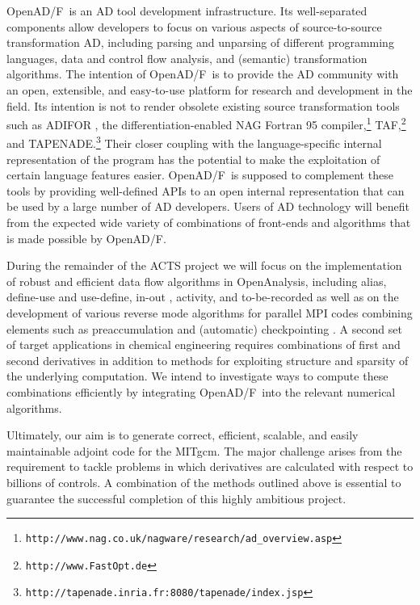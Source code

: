 \documentclass[11pt]{article}
\newcommand{\OpenADF}{OpenAD/F}
\newcommand{\OpenAnalysis}{OpenAnalysis}
\newcommand{\code}[1]{{\small\tt{#1}}}
\begin{document}
\OpenADF\ is an AD tool development infrastructure. Its well-separated components
allow developers to focus on various aspects of source-to-source 
transformation AD, including parsing and unparsing of different programming
languages, data and control flow analysis, and (semantic) transformation 
algorithms. The intention of \OpenADF\ is to provide the AD community with 
an open, extensible, and easy-to-use platform for research and development
in the field. Its intention is not to render obsolete existing source transformation
tools such as ADIFOR \cite{adiforWeb}, 
the differentiation-enabled NAG Fortran 95 
compiler,\footnote{\code{http://www.nag.co.uk/nagware/research/ad\_overview.asp}} TAF,\footnote{\code{http://www.FastOpt.de}} and TAPENADE.\footnote{\code{http://tapenade.inria.fr:8080/tapenade/index.jsp}} 
Their closer coupling with the language-specific internal representation of 
the program has the potential to make the
exploitation of certain language features easier. \OpenADF\ is supposed to 
complement these tools by providing well-defined APIs to an open internal 
representation that can be used by a large number of AD developers.
Users of AD technology will benefit from the expected wide
variety of combinations of front-ends and algorithms that is made possible
by \OpenADF.

During the remainder of the ACTS project we will focus on the implementation
of robust and efficient data flow algorithms in \OpenAnalysis, including alias, 
define-use and use-define, in-out \cite{Muc97}, 
activity, and to-be-recorded \cite{HNP02} as well as on 
the development of various reverse mode algorithms for parallel MPI codes
combining elements such as preaccumulation and (automatic) checkpointing
\cite{Gri92}. 
A second set of target 
applications in chemical engineering \cite{FTB97} requires combinations of first and 
second derivatives in addition to methods for exploiting structure and sparsity
of the underlying computation. We intend to investigate ways to compute these
combinations efficiently by integrating \OpenADF\ into the relevant 
numerical algorithms.

Ultimately, our aim is to generate correct, efficient, scalable, and easily 
maintainable adjoint code for the MITgcm. The major challenge arises from the
requirement to tackle problems in which derivatives are calculated with respect 
to billions of controls. A combination of the methods outlined above is 
essential to guarantee the successful completion of this highly ambitious
project.
\end{document}
